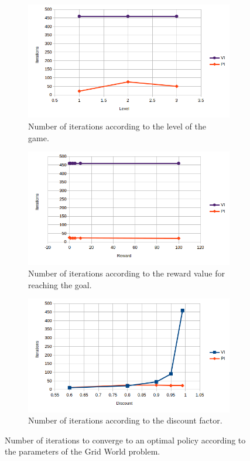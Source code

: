 \documentclass[10pt, twocolumn]{article}
\begin{document}
				\begin{figure}[]
					\centering
					\begin{subfigure}[t]{0.49\textwidth}
						\centering
						\includegraphics[width=.7\textwidth]{../graphics/BlockDude_level_iterations.png}
						\caption{Number of iterations according to the level of the game.}
						\label{fig:BD:level}
					\end{subfigure}
					\begin{subfigure}[t]{0.49\textwidth}
						\centering
						\includegraphics[width=.7\textwidth]{../graphics/BlockDude_reward_iterations.png}
						\caption{Number of iterations according to the reward value for reaching the goal.}
						\label{fig:BD:reward}
					\end{subfigure}
					\begin{subfigure}[t]{0.49\textwidth}
						\centering
						\includegraphics[width=.7\textwidth]{../graphics/BlockDude_discount_iterations.png}
						\caption{Number of iterations according to the discount factor.}
						\label{fig:BD:discount}
					\end{subfigure}
					\caption{Number of iterations to converge to an optimal policy according to the parameters of the Grid World problem.}
					\label{fig:BD:iterations}
				\end{figure}
\end{document}
